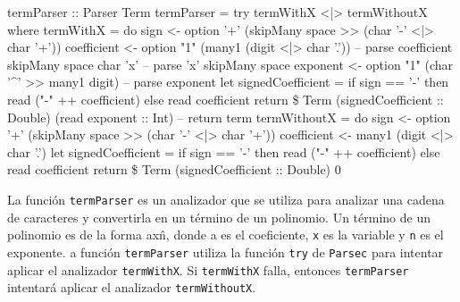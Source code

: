 \documentclass{article}
\begin{document}
\begin{haskell}
  termParser :: Parser Term
  termParser = try termWithX <|> termWithoutX
  where
    termWithX = do
      sign <- option '+' (skipMany space >> (char '-' <|> char '+'))
      coefficient <- option "1" (many1 (digit <|> char '.')) -- parse coefficient
      skipMany space
      char 'x' -- parse 'x'
      skipMany space
      exponent <- option "1" (char '^' >> many1 digit) -- parse exponent
      let signedCoefficient = if sign == '-' then read ("-" ++ coefficient) else read coefficient
      return \$ Term (signedCoefficient :: Double) (read exponent :: Int) -- return term
    termWithoutX = do
      sign <- option '+' (skipMany space >> (char '-' <|> char '+'))
      coefficient <- many1 (digit <|> char '.')
      let signedCoefficient = if sign == '-' then read ("-" ++ coefficient) else read coefficient
      return \$ Term (signedCoefficient :: Double) 0
\end{haskell}

La función \texttt{termParser} es un analizador que se utiliza para analizar una cadena de caracteres y convertirla en un término de un polinomio. Un término de un polinomio es de la forma ax\^n, donde a es el coeficiente, \texttt{x} es la variable y \texttt{n} es el exponente.
a función \texttt{termParser} utiliza la función \texttt{try} de \texttt{Parsec} para intentar aplicar el analizador \texttt{termWithX}. Si \texttt{termWithX} falla, entonces \texttt{termParser} intentará aplicar el analizador \texttt{termWithoutX}.
\end{document}
